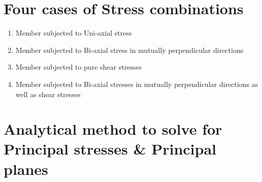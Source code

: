 \documentclass[8pt]{report}
\begin{document}
	\section{Four cases of Stress combinations}
		\begin{enumerate}
			\item Member subjected to Uni-axial stress
			\item Member subjected to Bi-axial stress in mutually perpendicular directions
			\item Member subjected to pure shear stresses
			\item Member subjected to Bi-axial stresses in mutually perpendicular directions as well as shear stresses
		\end{enumerate}\hrulefill
	\section{Analytical method to solve for Principal stresses \& Principal planes}
\end{document}
